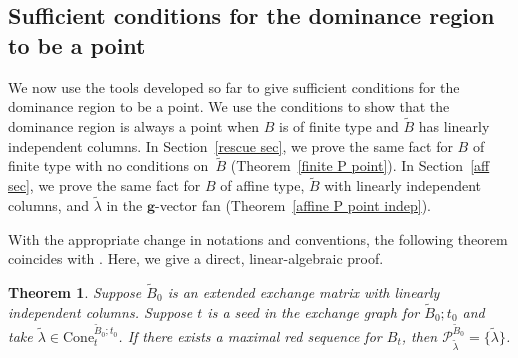 \documentclass{amsart}
\newtheorem{theorem}[proposition]{Theorem}
\theoremstyle{definition}
\theoremstyle{remark}
\numberwithin{equation}{section}
\newcommand{\set}[1]{{\lbrace #1 \rbrace}}
\newcommand{\0}{{\mathbf{0}}}
\newcommand{\Cone}{\mathrm{Cone}}
\newcommand{\g}{\mathbf{g}}
\newcommand{\tB}{{\widetilde{B}}}
\renewcommand{\P}{\mathcal{P}}
\begin{document}
\subsection{Sufficient conditions for the dominance region to be a point}\label{point sec}  
We now use the tools developed so far to give sufficient conditions for the dominance region to be a point.
We use the conditions to show that the dominance region is always a point when $B$ is of finite type and $\tB$ has linearly independent columns.
In Section~\ref{rescue sec}, we prove the same fact for $B$ of finite type with no conditions on~$\tB$ (Theorem~\ref{finite P point}).
In Section~\ref{aff sec}, we prove the same fact for $B$ of affine type, $\tB$ with linearly independent columns, and $\tilde\lambda$ in the $\g$-vector fan (Theorem~\ref{affine P point indep}). 

With the appropriate change in notations and conventions, the following theorem coincides with \cite[Lemma 3.4.12]{FanQin}.
Here, we give a direct, linear-algebraic proof. 

\begin{theorem}\label{P point}  
Suppose $\tB_0$ is an extended exchange matrix with linearly independent columns.
Suppose $t$ is a seed in the exchange graph for $\tB_0;t_0$ and take $\tilde\lambda\in\Cone^{\tB_0;t_0}_t$.
If there exists a maximal red sequence for $B_t$, then $\P^{\tB_0}_{\tilde\lambda}=\set{\tilde\lambda}$.
\end{theorem}
\end{document}

